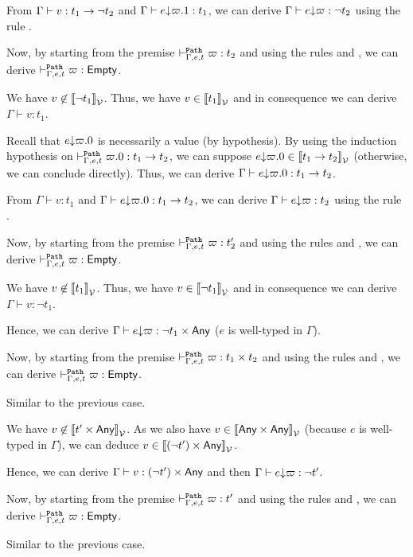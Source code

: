 \documentclass[a4paper]{article}
\theoremstyle{definition}
\begin{document}
\begin{description}
          From $\Gamma \vdash v:t_1\to \neg t_2$ and $\Gamma \vdash e{\downarrow}\varpi.1: t_1$, we can derive $\Gamma \vdash e{\downarrow}\varpi: \neg t_2$
          using the rule .

          Now, by starting from the premise $\vdash^{\texttt{Path}}_{\Gamma,e,t} \varpi:t_2$ and using the rules  and , we can derive
          $\vdash^{\texttt{Path}}_{\Gamma,e,t} \varpi:\textsf{Empty}$.
        
          \item[\Rule{PAppR}] We have $v \not\in {\llbracket \neg t_1 \rrbracket}_{\mathcal{V}}$. Thus, we have $v \in {\llbracket t_1 \rrbracket}_{\mathcal{V}}$ and in consequence
          we can derive $\Gamma \vdash v:t_1$. 

          Recall that $e{\downarrow}\varpi.0$ is necessarily a value (by hypothesis).
          By using the induction hypothesis on $\vdash^{\texttt{Path}}_{\Gamma,e,t} \varpi.0:t_1\to t_2$, we can suppose $e{\downarrow}\varpi.0 \in {\llbracket t_1\to t_2 \rrbracket}_{\mathcal{V}}$ (otherwise, we can conclude directly).
          Thus, we can derive $\Gamma \vdash e{\downarrow}\varpi.0: t_1\to t_2$.

          From $\Gamma \vdash v:t_1$ and $\Gamma \vdash e{\downarrow}\varpi.0: t_1\to t_2$, we can derive $\Gamma \vdash e{\downarrow}\varpi: t_2$
          using the rule .

          Now, by starting from the premise $\vdash^{\texttt{Path}}_{\Gamma,e,t} \varpi:t_2'$ and using the rules  and , we can derive
          $\vdash^{\texttt{Path}}_{\Gamma,e,t} \varpi:\textsf{Empty}$.

          \item[\Rule{PPairL}] We have $v \not\in {\llbracket t_1 \rrbracket}_{\mathcal{V}}$. Thus, we have $v \in {\llbracket \neg t_1 \rrbracket}_{\mathcal{V}}$
          and in consequence we can derive $\Gamma \vdash v:\neg t_1$.

          Hence, we can derive $\Gamma \vdash e{\downarrow}\varpi:\neg t_1\times \textsf{Any}$ ($e$ is well-typed in $\Gamma$).
     
          Now, by starting from the premise $\vdash^{\texttt{Path}}_{\Gamma,e,t} \varpi:t_1\times t_2$ and using the rules  and ,
          we can derive $\vdash^{\texttt{Path}}_{\Gamma,e,t} \varpi:\textsf{Empty}$.

          \item[\Rule{PPairR}] Similar to the previous case.

          \item[\Rule{PFst}] We have $v \not\in {\llbracket t'\times \textsf{Any}\rrbracket}_{\mathcal{V}}$.
          As we also have $v \in {\llbracket \textsf{Any}\times \textsf{Any}\rrbracket}_{\mathcal{V}}$ (because $e$ is well-typed in $\Gamma$),
          we can deduce $v \in {\llbracket (\neg t')\times \textsf{Any}\rrbracket}_{\mathcal{V}}$.

          Hence, we can derive $\Gamma \vdash v:(\neg t')\times \textsf{Any}$ and then $\Gamma \vdash e{\downarrow}\varpi:\neg t'$.
          
          Now, by starting from the premise $\vdash^{\texttt{Path}}_{\Gamma,e,t} \varpi:t'$ and using the rules  and ,
          we can derive $\vdash^{\texttt{Path}}_{\Gamma,e,t} \varpi:\textsf{Empty}$.
          \item[\Rule{PSnd}] Similar to the previous case.
        \end{description}
\end{document}
